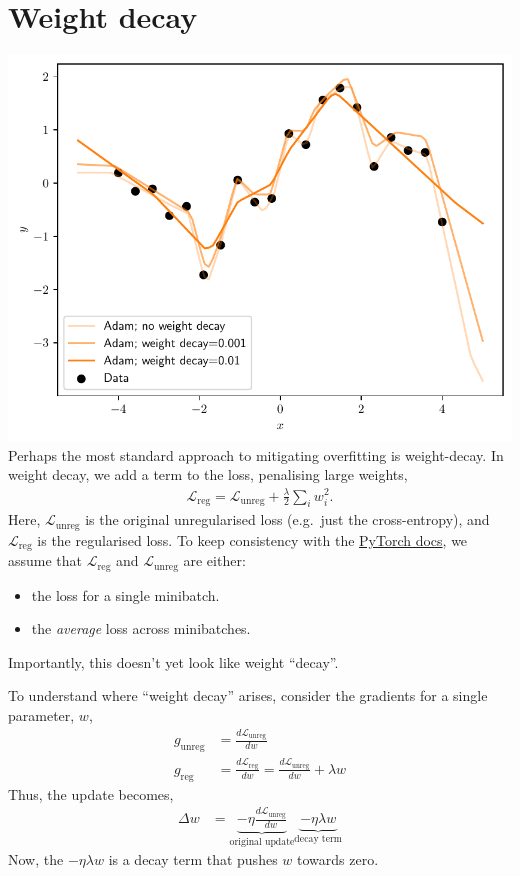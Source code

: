 \documentclass{article}
\newcommand{\dt}[2][]{\frac{d #1}{d #2}}
\newcommand{\0}{\mathbf{0}}
\renewcommand{\L}{\mathcal{L}}
\newcommand{\Lreg}{\L_\text{reg}}
\newcommand{\Lunreg}{\L_\text{unreg}}
\newcommand{\dLreg}{\dt[\Lreg]}
\newcommand{\dLunreg}{\dt[\Lunreg]}
\newcommand{\greg}{g_\text{reg}}
\newcommand{\gunreg}{g_\text{unreg}}
\begin{document}
\section{Weight decay}
\includegraphics[width=\textwidth]{weight_decay.pdf}
Perhaps the most standard approach to mitigating overfitting is weight-decay.
In weight decay, we add a term to the loss, penalising large weights,
\begin{align}
  \label{eq:weight_decay_loss}
  \Lreg = \Lunreg + \tfrac{\lambda}{2} \sum_i w_i^2.
\end{align}
Here, $\Lunreg$ is the original unregularised loss (e.g.\ just the cross-entropy), and $\Lreg$ is the regularised loss.
To keep consistency with the \href{https://pytorch.org/docs/stable/generated/torch.optim.SGD.html}{PyTorch docs}, we assume that $\Lreg$ and $\Lunreg$ are either: 
\begin{itemize}
  \item the loss for a single minibatch.
  \item the \textit{average} loss across minibatches.
\end{itemize}
Importantly, this doesn't yet look like weight ``decay''.  

To understand where ``weight decay'' arises, consider the gradients for a single parameter, $w$,
\begin{align}
  \gunreg &= \dLunreg{w}\\
  \greg &= \dLreg{w} = \dLunreg{w} + \lambda w
\end{align}
Thus, the update becomes,
\begin{align}
  \Delta w &= \underbrace{- \eta \dLunreg{w}}_\text{original update} \underbrace{- \eta \lambda w}_\text{decay term}
\end{align}
Now, the $-\eta \lambda w$ is a decay term that pushes $w$ towards zero.
\end{document}
